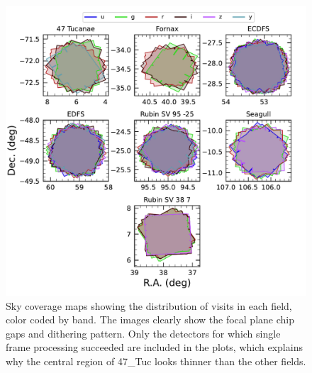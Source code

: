 \begin{figure}[ht]
\centering
 \includegraphics[width=\linewidth]{fieldSummaries}
 \caption{Sky coverage maps showing the distribution of visits in each field, color coded by band. The images clearly show the focal plane chip gaps and dithering pattern. Only the detectors for which single frame processing succeeded are included in the plots, which explains why the central region of 47\_Tuc looks thinner than the other fields. }
\label{fig:dp1_fields_coverage}
\end{figure}

